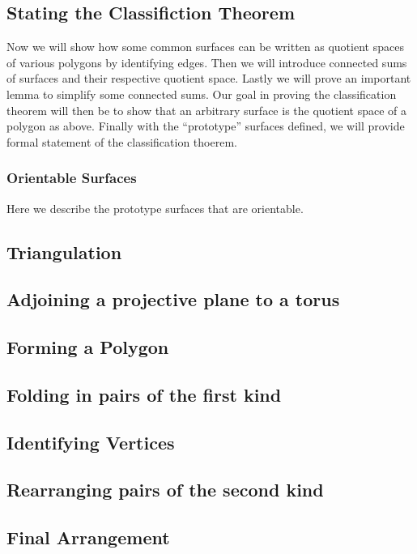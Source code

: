 \subsection{Stating the Classifiction Theorem}
\label{sec:surf:prototype}

Now we will show how some common surfaces can be written as quotient
spaces of various polygons by identifying edges. Then we will
introduce connected sums of surfaces and their respective quotient
space. Lastly we will prove an important lemma to simplify some
connected sums. Our goal in proving the classification theorem will
then be to show that an arbitrary surface is the quotient space of a
polygon as above. Finally with the ``prototype'' surfaces defined, we
will provide formal statement of the classification thoerem.

\subsubsection{Orientable Surfaces}

Here we describe the prototype surfaces that are orientable.





\subsection{Triangulation}
\label{sec:surf:triangulation}



\subsection{Adjoining a projective plane to a torus}
\label{sec:surf:adjoin}

\subsection{Forming a Polygon}
\label{sec:surf:polygon}

\subsection{Folding in pairs of the first kind}
\label{sec:surf:vertices}

\subsection{Identifying Vertices}
\label{sec:surf:folding}

\subsection{Rearranging pairs of the second kind}
\label{sec:surf:second}

\subsection{Final Arrangement}
\label{sec:surf:final}


